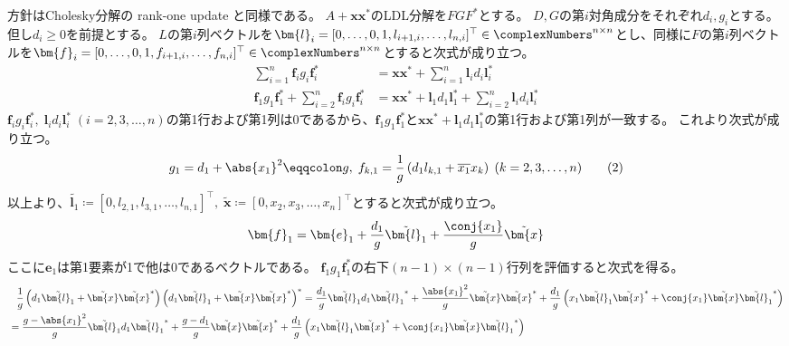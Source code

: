         \begin{derivation*}
            方針はCholesky分解の rank-one update と同様である。
            $A+\bm{x}\bm{x}^*$のLDL分解を$FGF^*$とする。
            $D,G$の第$i$対角成分をそれぞれ$d_i,g_i$とする。
            但し$d_i\geq 0$を前提とする。
            $L$の第$i$列ベクトルを$\bm{l}_i = [0,\dots,0,1,l_{i+1,i},\dots,l_{n,i}]^\top\in\complexNumbers^{n\times n}$とし、同様に$F$の第$i$列ベクトルを$\bm{f}_i = [0,\dots,0,1,f_{i+1,i},\dots,f_{n,i}]^\top\in\complexNumbers^{n\times n}$とすると次式が成り立つ。
            \begin{align*}
                \sum_{i=1}^n \bm{f}_i g_i\bm{f}_i^* &= \bm{x}\bm{x}^* + \sum_{i=1}^n \bm{l}_i d_i\bm{l}_i^* \\
                \bm{f}_1 g_1\bm{f}_1^* + \sum_{i=2}^n \bm{f}_i g_i\bm{f}_i^* &= \bm{x}\bm{x}^* + \bm{l}_1 d_1\bm{l}_1^* + \sum_{i=2}^n \bm{l}_i d_i\bm{l}_i^* \tag{1}
            \end{align*}
            $\bm{f}_i g_i\bm{f}_i^*,\;\bm{l}_i d_i\bm{l}_i^*\;(i=2,3,\dots,n)$の第1行および第1列は0であるから、$\bm{f}_1 g_1\bm{f}_1^*$と$\bm{x}\bm{x}^* + \bm{l}_1 d_1\bm{l}_1^*$の第1行および第1列が一致する。
            これより次式が成り立つ。
            \[ g_1 = d_1 + \abs{x_1}^2 \eqqcolon g,\; f_{k,1} = \frac{1}{g}\left(d_1 l_{k,1} + \overline{x_1}x_k\right) \; (k=2,3,\dots,n) \tag{2} \]
            以上より、$\tilde{\bm{l}_1} \coloneq [0,l_{2,1},l_{3,1},\dots,l_{n,1}]^\top,\;\tilde{\bm{x}} \coloneq [0,x_2,x_3,\dots,x_n]^\top$とすると次式が成り立つ。
            \[ \bm{f}_1 = \bm{e}_1 + \frac{d_1}{g}\tilde{\bm{l}_1} + \frac{\conj{x_1}}{g}\tilde{\bm{x}} \]
            ここに$\bm{e}_1$は第1要素が1で他は0であるベクトルである。
            $\bm{f}_1 g_1\bm{f}_1^*$の右下$(n-1)\times(n-1)$行列を評価すると次式を得る。
            \begin{align*}
                &\phantom{=} \frac{1}{g}\left(d_1\tilde{\bm{l}_1} + \tilde{\bm{x}}\tilde{\bm{x}}^*\right)\left(d_1\tilde{\bm{l}_1} + \tilde{\bm{x}}\tilde{\bm{x}}^*\right)^* = \frac{d_1}{g}\tilde{\bm{l}_1}d_1\tilde{\bm{l}_1}^* + \frac{\abs{x_1}^2}{g}\tilde{\bm{x}}\tilde{\bm{x}}^* + \frac{d_1}{g}\left(x_1\tilde{\bm{l}_1}\tilde{\bm{x}}^* + \conj{x_1}\tilde{\bm{x}}\tilde{\bm{l}_1}^*\right) \\
                &= \frac{g - \abs{x_1}^2}{g}\tilde{\bm{l}_1}d_1\tilde{\bm{l}_1}^* + \frac{g-d_1}{g}\tilde{\bm{x}}\tilde{\bm{x}}^* + \frac{d_1}{g}\left(x_1\tilde{\bm{l}_1}\tilde{\bm{x}}^* + \conj{x_1}\tilde{\bm{x}}\tilde{\bm{l}_1}^*\right) \\

\end{align*}
\end{derivation*}
